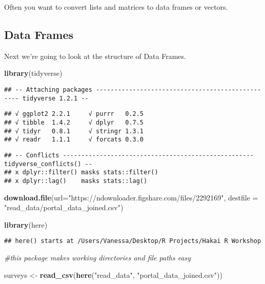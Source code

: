 \documentclass[]{article}
\newenvironment{Shaded}{\begin{snugshade}}{\end{snugshade}}
\newcommand{\KeywordTok}[1]{\textcolor[rgb]{0.13,0.29,0.53}{\textbf{#1}}}
\newcommand{\DataTypeTok}[1]{\textcolor[rgb]{0.13,0.29,0.53}{#1}}
\newcommand{\StringTok}[1]{\textcolor[rgb]{0.31,0.60,0.02}{#1}}
\newcommand{\CommentTok}[1]{\textcolor[rgb]{0.56,0.35,0.01}{\textit{#1}}}
\newcommand{\NormalTok}[1]{#1}
\begin{document}
Often you want to convert lists and matrices to data frames or vectors.

\subsection{Data Frames}\label{data-frames}

Next we're going to look at the structure of Data Frames.

\begin{Shaded}
\begin{Highlighting}[]
\KeywordTok{library}\NormalTok{(tidyverse)}
\end{Highlighting}
\end{Shaded}

\begin{verbatim}
## -- Attaching packages ------------------------------------------------- tidyverse 1.2.1 --
\end{verbatim}

\begin{verbatim}
## √ ggplot2 2.2.1     √ purrr   0.2.5
## √ tibble  1.4.2     √ dplyr   0.7.5
## √ tidyr   0.8.1     √ stringr 1.3.1
## √ readr   1.1.1     √ forcats 0.3.0
\end{verbatim}

\begin{verbatim}
## -- Conflicts ---------------------------------------------------- tidyverse_conflicts() --
## x dplyr::filter() masks stats::filter()
## x dplyr::lag()    masks stats::lag()
\end{verbatim}

\begin{Shaded}
\begin{Highlighting}[]
\KeywordTok{download.file}\NormalTok{(}\DataTypeTok{url=}\StringTok{"https://ndownloader.figshare.com/files/2292169"}\NormalTok{, }\DataTypeTok{destfile =} \StringTok{"read_data/portal_data_joined.csv"}\NormalTok{)}

\KeywordTok{library}\NormalTok{(here)}
\end{Highlighting}
\end{Shaded}

\begin{verbatim}
## here() starts at /Users/Vanessa/Desktop/R Projects/Hakai R Workshop
\end{verbatim}

\begin{Shaded}
\begin{Highlighting}[]
\CommentTok{#this package makes working directories and file paths easy}

\NormalTok{surveys <-}\StringTok{ }\KeywordTok{read_csv}\NormalTok{(}\KeywordTok{here}\NormalTok{(}\StringTok{"read_data"}\NormalTok{, }\StringTok{"portal_data_joined.csv"}\NormalTok{))}
\end{Highlighting}
\end{Shaded}
\end{document}
